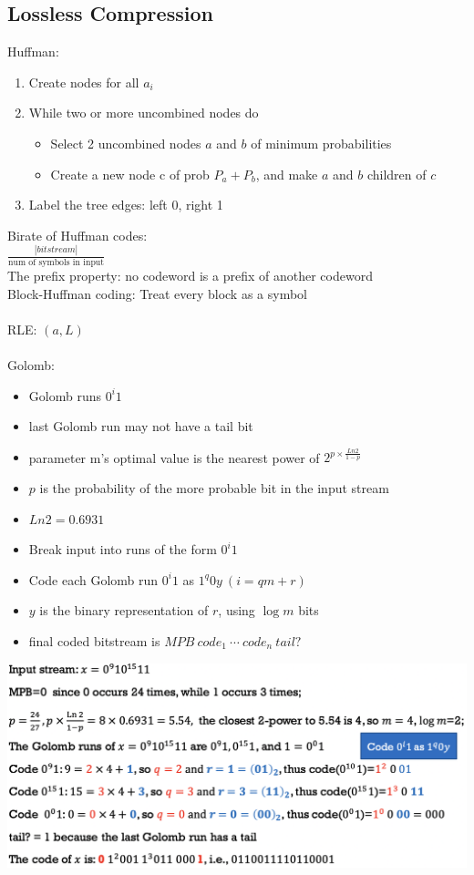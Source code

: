 \subsection*{Lossless Compression}
Huffman:
\begin{enumerate}
    \item Create nodes for all $a_i$
    \item While two or more uncombined nodes do 
    \begin{itemize}
        \item Select 2 uncombined nodes $a$ and $b$ of minimum probabilities
        \item Create a new node c of prob $P_a+P_b$, and make $a$ and $b$ children of $c$
    \end{itemize}
    \item Label the tree edges: left 0, right 1
\end{enumerate}
Birate of Huffman codes:\\
$\frac{|bitstream|}{\text{num of symbols in input}}$\\
The prefix property: {\color{myblue}no codeword is a prefix of another codeword}\\
Block-Huffman coding: {\color{myblue}Treat every block as a symbol}\\\\
RLE: $(a,L)$\\\\
Golomb:
\begin{itemize}
    \item Golomb runs $0^i1$
    \item last Golomb run may not have a tail bit
    \item parameter m's optimal value is the nearest power of $2^{p\times \frac{Ln2}{1-p}}$
    \item $p$ is the probability of the more probable bit in the input stream
    \item $Ln2=0.6931$
    \item Break input into runs of the form $0^i1$
    \item Code each Golomb run $0^i1$ as $1^q0y\ (i=qm+r)$
    \item $y$ is the binary representation of $r$, using $\log m$ bits
    \item final coded bitstream is $MPB\ code_1\ \cdots\ code_n\ tail?$
\end{itemize}
\includegraphics[width=\columnwidth]{golomb_example.png}

